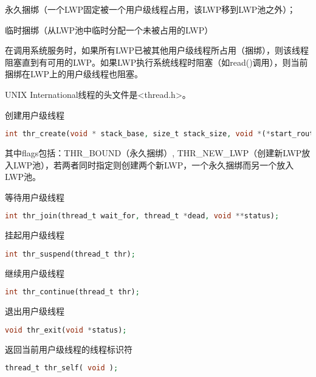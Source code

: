 \begin{compactitem}
\item 永久捆绑（一个LWP固定被一个用户级线程占用，该LWP移到LWP池之外）；
\item 临时捆绑（从LWP池中临时分配一个未被占用的LWP）
\end{compactitem}

在调用系统服务时，如果所有LWP已被其他用户级线程所占用（捆绑），则该线程阻塞直到有可用的LWP。如果LWP执行系统线程时阻塞（如read()调用），则当前捆绑在LWP上的用户级线程也阻塞。

UNIX International线程的头文件是<thread.h>。

\begin{compactitem}
\item 创建用户级线程

\begin{lstlisting}[language=PHP]
int thr_create(void * stack_base, size_t stack_size, void *(*start_routine，void *), void * arg, long flags, thread_t * new_thr);
\end{lstlisting}

其中flags包括：THR\_BOUND（永久捆绑）, THR\_NEW\_LWP（创建新LWP放入LWP池），若两者同时指定则创建两个新LWP，一个永久捆绑而另一个放入LWP池。

\item 等待用户级线程

\begin{lstlisting}[language=PHP]
int thr_join(thread_t wait_for, thread_t *dead, void **status);
\end{lstlisting}

\item 挂起用户级线程

\begin{lstlisting}[language=PHP]
int thr_suspend(thread_t thr);
\end{lstlisting}

\item 继续用户级线程

\begin{lstlisting}[language=PHP]
int thr_continue(thread_t thr);
\end{lstlisting}

\item 退出用户级线程

\begin{lstlisting}[language=PHP]
void thr_exit(void *status);
\end{lstlisting}

\item 返回当前用户级线程的线程标识符

\begin{lstlisting}[language=PHP]
thread_t thr_self( void );
\end{lstlisting}

\end{compactitem}

